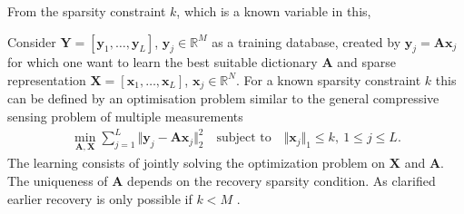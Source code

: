From the sparsity constraint $k$, which is a known variable in this, 



Consider $\mathbf{Y} = \left[ \mathbf{y}_1, \dots, \mathbf{y}_L \right]$, $\mathbf{y}_j \in \mathbb{R}^M$ as a training database, created by $\mathbf{y}_j = \mathbf{A}\mathbf{x}_j$ for which one want to learn the best suitable dictionary $\mathbf{A}$ and sparse representation $\mathbf{X} = \left[ \mathbf{x}_1, \dots, \mathbf{x}_L  \right]$, $\mathbf{x}_j \in \mathbb{R}^N$. For a known sparsity constraint $k$ this can be defined by an optimisation problem similar to the general compressive sensing problem of multiple measurements \cite{Elad_book}
\begin{align}\label{eq:SVD1}
\min_{\mathbf{A,X}} \sum_{j=1}^{L} \Vert \mathbf{y}_j - \mathbf{Ax}_j \Vert_2^2 \quad \text{subject to} \quad \Vert \textbf{x}_j \Vert_1 \leq k, \ 1 \leq j \leq L.
\end{align}  
The learning consists of jointly solving the optimization problem on $\mathbf{X}$ and $\mathbf{A}$. The uniqueness of $\mathbf{A}$ depends on the recovery sparsity condition. As clarified earlier recovery is only possible if $k < M$ \cite{phd2015}. 

